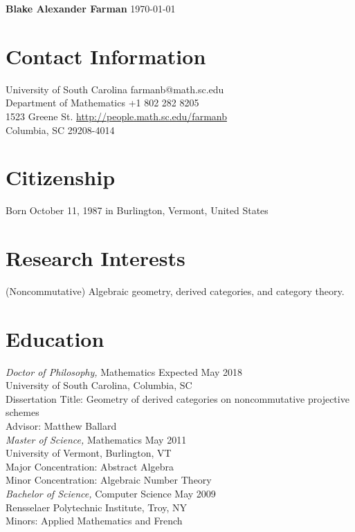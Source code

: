 \documentclass{article}
\begin{document}
\noindent\textbf{\large{Blake Alexander Farman}} \hfill \today\\
\noindent\makebox[\linewidth]{\rule{\textwidth}{0.4pt}}

\section*{Contact Information}
  University of South Carolina \hfill farmanb@math.sc.edu\\
  Department of Mathematics \hfill +1 802 282 8205\\
  1523 Greene St. \hfill \hyperref[http://people.math.sc.edu/farmanb]{http://people.math.sc.edu/farmanb}\\
  Columbia, SC 29208-4014

  \section*{Citizenship}
  Born October 11, 1987 in Burlington, Vermont, United States

  \section*{Research Interests}
  (Noncommutative) Algebraic geometry, derived categories, and category theory.
  
  \section*{Education} 
  \textsl{Doctor of Philosophy,} Mathematics \hfill Expected May 2018\\
  University of South Carolina, Columbia, SC\\
  Dissertation Title: Geometry of derived categories on noncommutative projective schemes\\
  Advisor: Matthew Ballard\\
  
  \noindent
  \textsl{Master of Science,} Mathematics \hfill May 2011\\
  University of Vermont, Burlington, VT\\
  Major Concentration: Abstract Algebra\\
  Minor Concentration: Algebraic Number Theory\\
  
  \noindent\textsl{Bachelor of Science,} Computer Science \hfill May 2009\\
  Rensselaer Polytechnic Institute, Troy, NY\\
  Minors: Applied Mathematics and French
  
\end{document}
